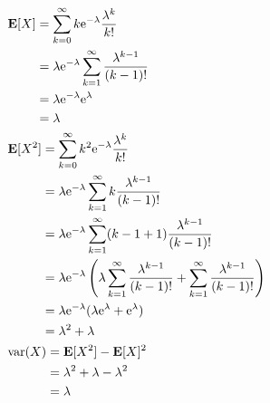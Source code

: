 \begin{example}
    \begin{align}
    &\begin{aligned}
        \mathbf{E}[X] &= \sum_{k=0}^{\infty} k \mathrm{e}^{-\lambda} \frac{\lambda^{k}}{k!} \\
                      &= \lambda \mathrm{e}^{-\lambda} \sum_{k=1}^{\infty} \frac{\lambda^{k-1}}{(k-1)!} \\
                      &= \lambda \mathrm{e}^{-\lambda} \mathrm{e}^{\lambda} \\
                      &= \lambda
    \end{aligned} \\
    &\begin{aligned}
        \mathbf{E}[X^{2}] &= \sum_{k=0}^{\infty} k^{2} \mathrm{e}^{-\lambda} \frac{\lambda^{k}}{k!} \\
                         &= \lambda \mathrm{e}^{-\lambda} \sum_{k=1}^{\infty} k \frac{\lambda^{k-1}}{(k-1)!} \\
                         &= \lambda \mathrm{e}^{-\lambda} \sum_{k=1}^{\infty} (k-1+1) \frac{\lambda^{k-1}}{(k-1)!} \\
                         &= \lambda \mathrm{e}^{-\lambda} \left(\lambda \sum_{k=1}^{\infty} \frac{\lambda^{k-1}}{(k-1)!} + \sum_{k=1}^{\infty} \frac{\lambda^{k-1}}{(k-1)!}\right) \\
                         &= \lambda \mathrm{e}^{-\lambda} (\lambda \mathrm{e}^{\lambda} + \mathrm{e}^{\lambda}) \\
                         &= \lambda^{2} + \lambda
    \end{aligned} \\
    &\begin{aligned}
        \mathrm{var}(X) &= \mathbf{E}[X^{2}] - \mathbf{E}[X]^{2} \\
                        &= \lambda^{2} + \lambda - \lambda^{2} \\
                        &= \lambda
    \end{aligned}
    \end{align}
\end{example}

